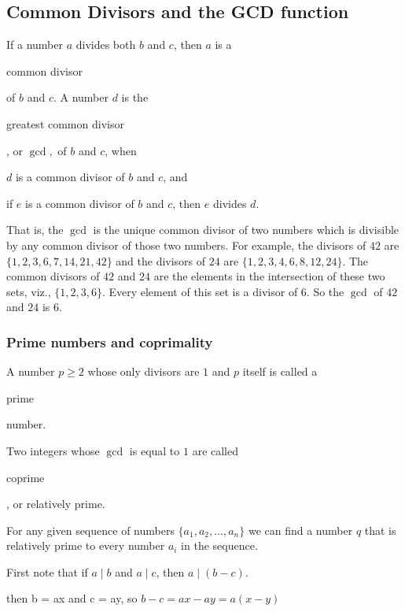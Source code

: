 \documentclass[11pt]{article}
\theoremstyle{plain}
\theoremstyle{definition}
\newenvironment{packed_items}{
\begin{itemize}
  \setlength{\itemsep}{1pt}
  \setlength{\parskip}{0pt}
  \setlength{\parsep}{0pt}
}{\end{itemize}}
\begin{document}
\subsection*{Common Divisors and the GCD function}

If a number $a$ divides both $b$ and $c$, then $a$ is a \begin{em}common divisor\end{em} of $b$ and $c$. A number $d$ is the \begin{em}greatest common divisor\end{em}, or $\gcd,$ of $b$ and $c$, when

\begin{packed_items}
  \item $d$ is a common divisor of $b$ and $c$, and
  \item if $e$ is a common divisor of $b$ and $c$, then $e$ divides $d.$
\end{packed_items}

That is, the $\gcd$ is the unique common divisor of two numbers which is divisible by any common divisor of those two numbers. For example, the divisors of $42$ are $\{ 1,2,3,6,7,14,21,42 \}$ and the divisors of $24$ are $\{ 1,2,3,4,6,8,12,24 \}$. The common divisors of $42$ and $24$ are the elements in the intersection of these two sets, viz., $\{ 1,2,3,6 \}$. Every element of this set is a divisor of $6$. So the $\gcd$ of $42$ and $24$ is $6.$

\subsubsection*{Prime numbers and coprimality}

A number $p \ge 2$ whose only divisors are $1$ and $p$ itself is called a \begin{em}prime\end{em} number.

Two integers whose $\gcd$ is equal to $1$ are called \begin{em}coprime\end{em}, or relatively prime.

For any given sequence of numbers $\{a_1, a_2, \dots, a_n\}$ we can find a number $q$ that is relatively prime to every number $a_i$ in the sequence.


First note that if $a \mid b$ and $a \mid c$, then $a \mid (b - c)$.

then b = ax and c = ay, so $b - c = ax - ay = a(x - y)$
\end{document}
